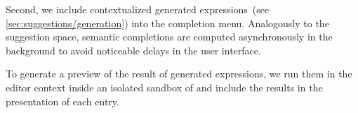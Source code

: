 Second, we include contextualized generated expressions~(see \cref{sec:suggestions/generation}) into the completion menu.
Analogously to the suggestion space, semantic completions are computed asynchronously in the background to avoid noticeable delays in the user interface.

To generate a preview of the result of generated expressions, we run them in the editor context inside an isolated sandbox of  and include the results in the presentation of each entry.
